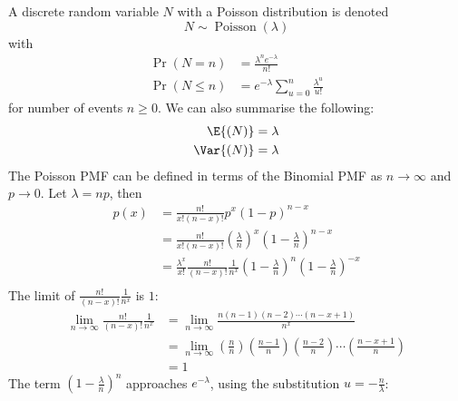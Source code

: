 \documentclass{article}
\begin{document}
A discrete random variable \(N\) with a Poisson distribution is denoted
\begin{equation*}
    N \sim \operatorname{Poisson}{\left( \lambda \right)}
\end{equation*}
with
\begin{align*}
    \Pr{\left( N = n \right)}    & = \frac{\lambda^n e^{-\lambda}}{n!}                \\
    \Pr{\left( N \leq n \right)} & = e^{-\lambda} \sum_{u = 0}^n \frac{\lambda^u}{u!}
\end{align*}
for number of events \(n \geq 0\).
We can also summarise the following:
\begin{align*}
    \E{\left( N \right)}   & = \lambda \\
    \Var{\left( N \right)} & = \lambda
\end{align*}
The Poisson PMF can be defined in terms of the Binomial PMF as \(n \to \infty\) and \(p \to 0\).
Let \(\lambda = np\), then
\begin{align*}
    p\left( x \right) & = \frac{n!}{x! \left( n - x \right)!} p^x \left( 1 - p \right)^{n - x}                                                                                 \\
                      & = \frac{n!}{x! \left( n - x \right)!} \left( \frac{\lambda}{n} \right)^x \left( 1 - \frac{\lambda}{n} \right)^{n - x}                                  \\
                      & = \frac{\lambda^x}{x!} \frac{n!}{\left( n - x \right)!} \frac{1}{n^x} \left( 1 - \frac{\lambda}{n} \right)^n \left( 1 - \frac{\lambda}{n} \right)^{-x} \\
\end{align*}
The limit of \(\frac{n!}{\left( n - x \right)!} \frac{1}{n^x}\) is \(1\):
\begin{align*}
    \lim_{n \to \infty} \frac{n!}{\left( n - x \right)!} \frac{1}{n^x} & = \lim_{n \to \infty} \frac{n\left( n - 1 \right) \left( n - 2 \right) \cdots \left( n - x + 1 \right)}{n^x}                                            \\
                                                                       & = \lim_{n \to \infty} \left( \frac{n}{n} \right)\left( \frac{n - 1}{n} \right) \left( \frac{n - 2}{n} \right) \cdots \left( \frac{n - x + 1}{n} \right) \\
                                                                       & = 1
\end{align*}
The term \(\left( 1 - \frac{\lambda}{n} \right)^n\) approaches \(e^{-\lambda}\), using the substitution \(u = -\frac{n}{\lambda}\):
\end{document}
